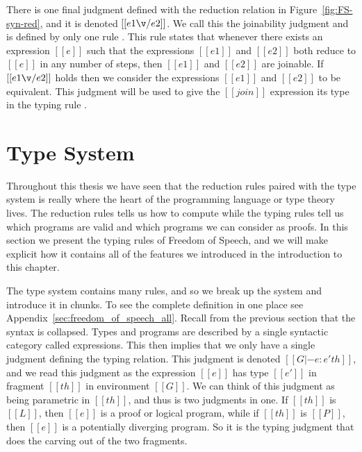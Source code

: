 There is one final judgment defined with the reduction relation in
Figure~\ref{fig:FS-syn-red}, and it is denoted $[[e1 \v/ e2]]$. We
call this the joinability judgment and is defined by only one rule
. This rule states that whenever there exists
an expression $[[e]]$ such that the expressions $[[e1]]$ and $[[e2]]$
both reduce to $[[e]]$ in any number of steps, then $[[e1]]$ and
$[[e2]]$ are joinable.  If $[[e1 \v/ e2]]$ holds then we consider the
expressions $[[e1]]$ and $[[e2]]$ to be equivalent.  This judgment
will be used to give the $[[join]]$ expression its type in the typing
rule .

\section{Type System}
\label{sec:type_system}
Throughout this thesis we have seen that the reduction rules paired
with the type system is really where the heart of the programming
language or type theory lives.  The reduction rules tells us how to
compute while the typing rules tell us which programs are valid and
which programs we can consider as proofs.  In this section we present
the typing rules of Freedom of Speech, and we will make explicit how
it contains all of the features we introduced in the introduction to
this chapter.  

The type system contains many rules, and so we break up the system and
introduce it in chunks.  To see the complete definition in one place
see Appendix~\ref{sec:freedom_of_speech_all}.  Recall from the
previous section that the syntax is collapsed.  Types and programs are
described by a single syntactic category called expressions.  This
then implies that we only have a single judgment defining the typing
relation.  This judgment is denoted $[[G |- e : e' th]]$, and we read
this judgment as the expression $[[e]]$ has type $[[e']]$ in fragment
$[[th]]$ in environment $[[G]]$.  We can think of this judgment as
being parametric in $[[th]]$, and thus is two judgments in one.  If
$[[th]]$ is $[[L]]$, then $[[e]]$ is a proof or logical program, while
if $[[th]]$ is $[[P]]$, then $[[e]]$ is a potentially diverging
program.  So it is the typing judgment that does the carving out of
the two fragments.

